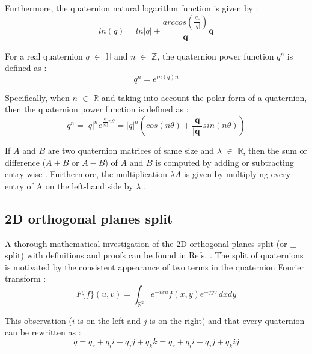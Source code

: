 \documentclass[superscriptaddress,longbibliography,aps,prl,twocolumn,10pt]{revtex4-2}
\begin{document}
\noindent
Furthermore, the quaternion natural logarithm function is given by \cite{Morais2014, 1711.02508}:
    \begin{equation} \label{eq:logarithm}
        ln(q) = ln \left| q \right|+\frac{arccos \left( \frac{q_{r}}{\left| q \right|} \right)}{\left| \boldsymbol{q} \right|}
        \boldsymbol{q}
    \end{equation}
    
\noindent
For a real quaternion $q$ $\in$ $\mathbb{H}$ and $n$ $\in$ $\mathbb{Z}$, the quaternion power function $q^n$ is defined as \cite{Morais2014}:
    \begin{equation} \label{eq:power1}
        q^n = e^{ln(q)n}
    \end{equation}

\noindent
Specifically, when $n$ $\in$ $\mathbb{R}$ and taking into account the polar form of a quaternion, then the quaternion power function is defined as \cite{Morais2014}:
    \begin{equation} \label{eq:power2}
        q^n = \left| q \right|^n e^{\frac{\boldsymbol{q}}{\left| \boldsymbol{q} \right|} n \theta} = 
        \left| q \right|^n \left(cos(n \theta) + \frac{\boldsymbol{q}}{\left| \boldsymbol{q} \right|} sin(n \theta) \right)
    \end{equation}

\noindent
If $A$ and $B$ are two quaternion matrices of same size and $\lambda$ $\in$ $\mathbb{R}$, then the sum or difference ($A + B$ or $A-B$) of $A$ and $B$ is computed by adding or subtracting entry-wise \cite{Morais2014}. Furthermore, the multiplication $\lambda A$ is given by multiplying every entry of A on the left-hand side by $\lambda$ \cite{Morais2014}.

\subsection*{\normalsize{2D orthogonal planes split}}
A thorough mathematical investigation of the 2D orthogonal planes split (or $\pm$ split) with definitions and proofs can be found in Refs. \cite{HitzerSangwine2013, Hitzer2015}. The split of quaternions is motivated by the consistent appearance of two terms in the quaternion Fourier transform \cite{HitzerSangwine2013, Hitzer2015}:
    \begin{equation} \label{eq:Fourier}
        F\{f\}(u,v) = \int_{\mathbb{R}^2} e^{-ixu} f(x,y) e^{-jyv} \,dxdy
    \end{equation}

\noindent
This observation ($i$ is on the left and $j$ is on the right) and that every quaternion can be rewritten as \cite{HitzerSangwine2013, Hitzer2015}:
    \begin{equation} \label{eq:rewrite}
        q = {q_r} + {q_i}i + {q_j}j + {q_k}k = {q_r} + {q_i}i + {q_j}j + {q_k}ij
    \end{equation}
\end{document}
